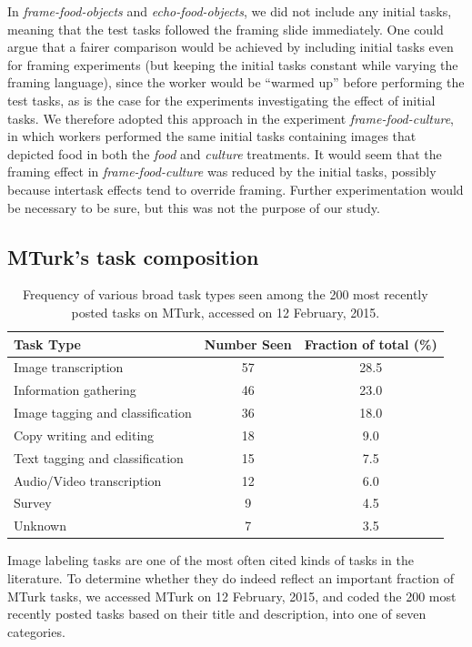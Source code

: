 \documentclass[12pt]{article}
\begin{document}
In \textit{frame-food-objects} and \textit{echo-food-objects}, we did not
include any initial tasks, meaning that the test tasks followed the framing
slide immediately.  One could argue that a fairer comparison would be achieved
by including initial tasks even for framing experiments (but keeping the
initial tasks constant while varying the framing language), since the worker
would be ``warmed up'' before performing the test tasks, as is the case for
the experiments investigating the effect of initial tasks. 
We therefore adopted this approach in the experiment 
\textit{frame-food-culture}, in which workers performed the same 
initial tasks containing images that depicted food in both the \textit{food}
and \textit{culture} treatments.  It would seem that the framing effect in 
\textit{frame-food-culture} was reduced by the initial tasks, possibly because
intertask effects tend to override framing. Further experimentation 
would be necessary to be sure, but this was not the purpose of our study.

\subsection*{MTurk's task composition}

\begin{table}
\centering
\begin{tabular}{l c c}
\toprule
Task Type & Number Seen & Fraction of total (\%) \\
\toprule
Image transcription & 57 & 28.5 \\
Information gathering & 46 & 23.0 \\
Image tagging and classification & 36 & 18.0 \\
Copy writing and editing & 18 & 9.0 \\
Text tagging and classification & 15 & 7.5 \\
Audio/Video transcription & 12 & 6.0 \\
Survey & 9 & 4.5 \\
Unknown & 7 & 3.5 \\
\bottomrule
\end{tabular}
\caption{
	Frequency of various broad task types seen among the 200 most 
	recently posted tasks on MTurk, accessed on 12 February, 2015.
}
\label{table:task_composition}
\end{table}
Image labeling tasks are one of the most often cited kinds of tasks in the
literature.  To determine whether they do indeed reflect an important fraction
of MTurk tasks, we accessed MTurk on 12 February, 2015, and coded the 200 
most recently posted tasks based on their title and description, 
into one of seven categories.
\end{document}
